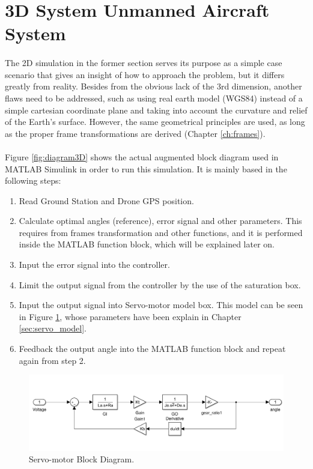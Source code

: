 
\section{3D System Unmanned Aircraft System}\label{sec:3d_sim}

\paragraph{}The 2D simulation in the former section serves its purpose as a simple case scenario that gives an insight of how to approach the problem, but it differs greatly from reality. Besides from the obvious lack of the 3rd dimension, another flaws need to be addressed, such as using real earth model (WGS84) instead of a simple cartesian coordinate plane  and taking into account the curvature and relief of the Earth's surface. However, the same geometrical principles are used, as long as the proper frame transformations are derived (Chapter \ref{ch:frames}).

\paragraph{} Figure \ref{fig:diagram3D} shows the actual augmented block diagram used in MATLAB Simulink in order to run this simulation. It is mainly based in the following steps:
\begin{enumerate}
\item{Read Ground Station and Drone GPS position.}
\item{Calculate optimal angles (reference), error signal and other parameters. This requires from frames transformation and other functions, and it is performed inside the MATLAB function block, which will be explained later on.}
\item{Input the error signal into the controller.}
\item{Limit the output signal from the controller by the use of the saturation box.}
\item{Input the output signal into Servo-motor model box. This model can be seen in Figure \ref{fig:servomotor3D}, whose parameters have been explain in Chapter \ref{sec:servo_model}.}
\item{Feedback the output angle into the MATLAB function block and repeat again from step 2.}
\end{enumerate}

\begin{figure}[h]
	\centering
	\includegraphics[width=1\textwidth]{figures/servomotor_3D.png}
	\caption{Servo-motor Block Diagram.}
   	\label{fig:servomotor3D}
\end{figure}


